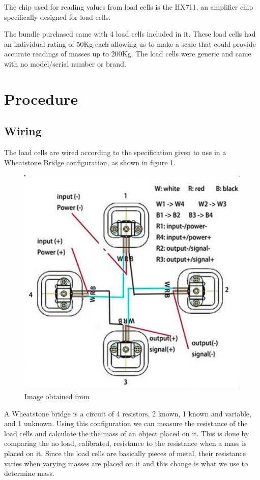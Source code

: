 \documentclass[letterpaper,11pt]{article}
\newcommand{\myLink}[2]{\href{#1}{\color{blue}\underline{\smash{\texttt{#2}}}}}
\begin{document}
The chip used for reading values from load cells is the HX711, an amplifier chip
specifically designed for load cells.

The bundle purchased came with 4 load cells included in it. These load cells had
an individual rating of 50Kg each allowing us to make a scale that could provide
accurate readings of masses up to 200Kg. The load cells were generic and came
with no model/serial number or brand.

\section{Procedure}
\subsection{Wiring}
The load cells are wired according to the specification given to use in a
Wheatstone Bridge configuration, as shown in figure \ref{img:banggood}.

\begin{figure}[h]
  \centering
  \includegraphics[scale=.5]{loadcellwiring}
  \caption{Image obtained from
    \myLink{https://www.banggood.com/4pcs-DIY-50KG-Body-Load-Cell-Weight-Strain-Sensor-Resistance-With-HX711-AD-Module-p-1326815.html}{Bang
      Good}}
  \label{img:banggood}
\end{figure}

A Wheatstone bridge is a circuit of 4 resistors, 2 known, 1 known and variable,
and 1 unknown. Using this configuration we can measure the resistance of the
load cells and calculate the the mass of an object placed on it. This is done by
comparing the no load, calibrated, resistance to the resistance when a mass is
placed on it. Since the load cells are basically pieces of metal, their
resistance varies when varying masses are placed on it and this change is what
we use to determine mass.
\end{document}
